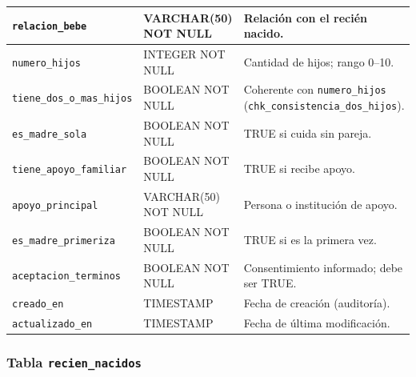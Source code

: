 \documentclass[12pt,letterpaper]{article}
\begin{document}
\begin{longtable}{p{}p{}p{}}
\texttt{relacion\_bebe} & VARCHAR(50) NOT NULL & Relación con el recién nacido.\\\hline
\texttt{numero\_hijos} & INTEGER NOT NULL & Cantidad de hijos; rango 0--10.\\\hline
\texttt{tiene\_dos\_o\_mas\_hijos} & BOOLEAN NOT NULL & Coherente con \texttt{numero\_hijos} (\texttt{chk\_consistencia\_dos\_hijos}).\\\hline
\texttt{es\_madre\_sola} & BOOLEAN NOT NULL & TRUE si cuida sin pareja.\\\hline
\texttt{tiene\_apoyo\_familiar} & BOOLEAN NOT NULL & TRUE si recibe apoyo.\\\hline
\texttt{apoyo\_principal} & VARCHAR(50) NOT NULL & Persona o institución de apoyo.\\\hline
\texttt{es\_madre\_primeriza} & BOOLEAN NOT NULL & TRUE si es la primera vez.\\\hline
\texttt{aceptacion\_terminos} & BOOLEAN NOT NULL & Consentimiento informado; debe ser TRUE.\\\hline
\texttt{creado\_en} & TIMESTAMP & Fecha de creación (auditoría).\\\hline
\texttt{actualizado\_en} & TIMESTAMP & Fecha de última modificación.\\\bottomrule
\end{longtable}

\subsubsection{Tabla \texttt{recien\_nacidos}}
\end{document}
